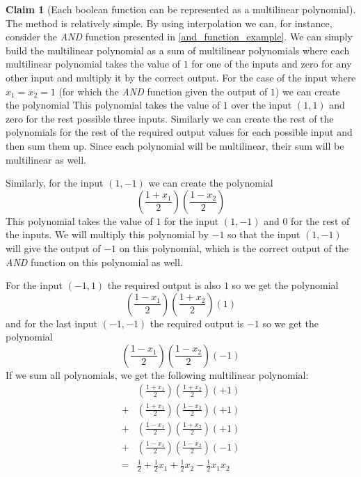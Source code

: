\documentclass[a4paper,titlepage,twocolumn]{book}
\theoremstyle{definition}
\newtheorem{claim}{Claim}[section]
\newcommand{\pair}[2]{\ensuremath{\left(#1,#2\right)}}
\begin{document}
\begin{claim} [Each boolean function can be represented as a multilinear polynomial] 
	
	The method is relatively simple. By using interpolation we can, for instance, consider the \emph{AND} function presented in \autoref{and_function_example}. We can simply build the multilinear polynomial as a sum of multilinear polynomials where each multilinear polynomial takes the value of $1$ for one of the inputs and zero for any other input and multiply it by the correct output. For the case of the input where $x_1 = x_2 = 1$ (for which the \emph{AND} function given the output of $1$) we can create the polynomial 
	This polynomial takes the value of $1$ over the input $\left(1,1\right)$ and zero for the rest possible three inputs. Similarly we can create the rest of the polynomials for the rest of the required output values for each possible input and then sum them up. Since each polynomial will be multilinear, their sum will be multilinear as well.

	Similarly, for the input $\left(1,-1\right)$ we can create the polynomial 
	\[\left(\frac{1+x_1}{2}\right)\left(\frac{1-x_2}{2}\right)\]
	This polynomial takes the value of $1$ for the input $\left(1,-1\right)$ and $0$ for the rest of the inputs. We will multiply this polynomial by $-1$ so that the input $\left(1,-1\right)$ will give the output of $-1$ on this polynomial, which is the correct output of the \emph{AND} function on this polynomial as well.
	
	For the input \pair{-1}{1} the required output is also $1$ so we get the polynomial
	\[\left(\frac{1-x_1}{2}\right)\left(\frac{1+x_2}{2}\right)\left(1\right)\]
	and for the last input \pair{-1}{-1} the required output is $-1$ so we get the polynomial
		\[\left(\frac{1-x_1}{2}\right)\left(\frac{1-x_2}{2}\right)\left(-1\right)\]
	If we sum all polynomials, we get the following multilinear polynomial:
\[
	\begin{split}
	  & \left(\frac{1+x_1}{2}\right)\left(\frac{1+x_2}{2}\right)\left(+1\right) \\
	+ & \left(\frac{1+x_1}{2}\right)\left(\frac{1-x_2}{2}\right)\left(+1\right) \\
	+ & \left(\frac{1-x_1}{2}\right)\left(\frac{1+x_2}{2}\right)\left(+1\right) \\
	+ & \left(\frac{1-x_1}{2}\right)\left(\frac{1-x_2}{2}\right)\left(-1\right) \\
	= & \frac{1}{2} + \frac{1}{2}x_1 +\frac{1}{2}x_2 - \frac{1}{2}x_1x_2
	\end{split}
\]


\end{claim}
\end{document}
